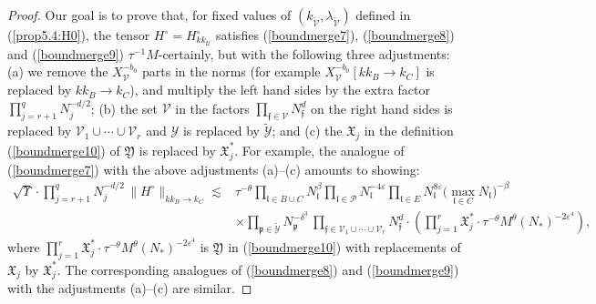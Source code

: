\documentclass[11 pt,reqno]{amsart}
\theoremstyle{definition}
\theoremstyle{remark}
\numberwithin{equation}{section}
\newcommand{\Pc}{\mathcal{P}}
\newcommand{\Uc}{\mathcal{U}}
\newcommand{\Vc}{\mathcal{V}}
\newcommand{\Yc}{\mathcal{Y}}
\newcommand{\pf}{\mathfrak{p}}
\newcommand{\ff}{\mathfrak{f}}
\newcommand{\Xf}{\mathfrak{X}}
\newcommand{\lf}{\mathfrak{l}}
\newcommand{\Yf}{\mathfrak{Y}}
\begin{document}
{\begin{proof}
Our goal is to prove that, for fixed values of $(k_{\widetilde{\Vc}},\lambda_{\widetilde{\Vc}})$ defined in (\ref{prop5.4:H0}), the tensor $H^\circ=H_{kk_\Uc}^\circ$ satisfies (\ref{boundmerge7}), (\ref{boundmerge8}) and (\ref{boundmerge9}) $\tau^{-1}M$-certainly, but with the following three adjustments: (a) we remove the $X_\Vc^{-b_0}$ parts in the norms
 (for example $X_\Vc^{-b_0}[kk_B\to k_C]$ is replaced by $kk_B\to k_C$), and multiply the left hand sides by the extra factor $\prod_{j=r+1}^q N_j^{-d/2}$; (b) the set $\Vc$ in the factors $\prod_{\ff\in\Vc}N_\ff^d$ on the right hand sides is replaced by $\Vc_1\cup\cdots\cup\Vc_r$ and $\Yc$ is replaced by $\widetilde{\Yc}$; and (c) the $\Xf_j$ in the definition (\ref{boundmerge10}) of $\Yf$ is replaced by $\Xf_j^*$. 
 For example, the analogue of (\ref{boundmerge7}) with the above adjustments (a)--(c) amounts to showing:
\begin{equation}\label{prop5.4:5.45'}
\begin{aligned}
\sqrt{\Upsilon}\cdot\prod_{j=r+1}^q N_j^{-d/2}\,\|H^\circ\|_{kk_{B}\to k_{C}}\lesssim&\tau^{-\theta}\prod_{\lf\in B\cup C}N_\lf^\beta\prod_{\lf\in\Pc}N_\lf^{-4\varepsilon}\prod_{\lf\in E}N_\lf^{8\varepsilon}\big(\max_{\lf\in C}N_\lf\big)^{-\beta}\\
&\times \prod_{\pf\in\widetilde{\Yc}}N_\pf^{-\delta^3}\, \prod_{\ff \in \Vc_1\cup\cdots\cup\Vc_r} N_\ff^d
\cdot\left(
\prod_{j=1}^r\Xf^*_j\cdot\tau^{-\theta}M^{\theta}(N_*)^{-2\varepsilon^4}\right),
\end{aligned}
\end{equation}
where   $\prod_{j=1}^r\Xf^*_j\cdot\tau^{-\theta}M^{\theta}(N_*)^{-2\varepsilon^4}$ is $\Yf$ in  (\ref{boundmerge10}) with replacements of $\Xf_j$ by $\Xf_j^*$. The corresponding analogues of (\ref{boundmerge8}) and (\ref{boundmerge9}) with the adjustments (a)--(c) are similar.



\end{proof}}
\end{document}
